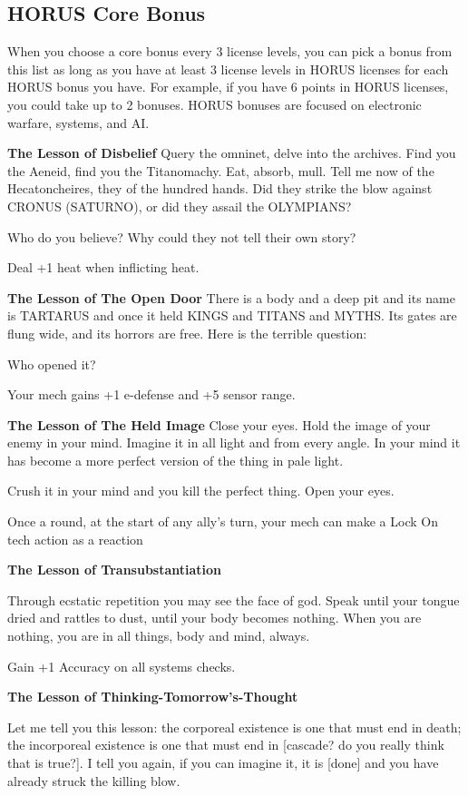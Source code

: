 \subsection{HORUS Core Bonus}

When you choose a core bonus every 3 license levels, you can pick a bonus from this list as long as you have at least 3 license levels in HORUS licenses for each HORUS bonus you have. For example, if you have 6 points in HORUS licenses, you could take up to 2 bonuses. HORUS bonuses are focused on electronic warfare, systems, and AI.

\textbf{The Lesson of Disbelief}
Query the omninet, delve into the archives. Find you the Aeneid, find you the Titanomachy. Eat, absorb, mull. Tell me now of the Hecatoncheires, they of the hundred hands. Did they strike the blow against CRONUS (SATURNO), or did they assail the OLYMPIANS?

Who do you believe? Why could they not tell their own story?

Deal +1 heat when inflicting heat.


\textbf{The Lesson of The Open Door}
There is a body and a deep pit and its name is TARTARUS and once it held KINGS and TITANS and MYTHS. Its gates are flung wide, and its horrors are free. Here is the terrible question:

Who opened it?

Your mech gains +1 e-defense and +5 sensor range.


\textbf{The Lesson of The Held Image}
Close your eyes. Hold the image of your enemy in your mind. Imagine it in all light and from every angle. In your mind it has become a more perfect version of the thing in pale light.

Crush it in your mind and you kill the perfect thing. Open your eyes.

Once a round, at the start of any ally's turn, your mech can make a Lock On tech action as a reaction


\textbf{The Lesson of Transubstantiation}

Through ecstatic repetition you may see the face of god. Speak until your tongue dried and rattles to dust, until your body becomes nothing. When you are nothing, you are in all things, body and mind, always.

Gain +1 Accuracy on all systems checks.

\textbf{The Lesson of Thinking-Tomorrow's-Thought}

Let me tell you this lesson: the corporeal existence is one that must end in death; the incorporeal existence is one that must end in [cascade? do you really think that is true?]. I tell you again, if you can imagine it, it is [done] and you have already struck the killing blow.

